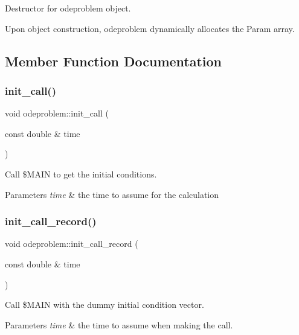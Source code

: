 Destructor for odeproblem object. 

Upon object construction, odeproblem dynamically allocates the Param array. 

\subsection{Member Function Documentation}
\mbox{\label{classodeproblem_a415e0001bfe1282764c339b6e8695ab8}} 
\subsubsection{\texorpdfstring{init\+\_\+call()}{init\_call()}}
{\footnotesize\ttfamily void odeproblem\+::init\+\_\+call (\begin{DoxyParamCaption}\item[{const double \&}]{time }\end{DoxyParamCaption})}

Call {\ttfamily \$\+M\+A\+IN} to get the initial conditions.


\begin{DoxyParams}{Parameters}
{\em time} & the time to assume for the calculation \\
\hline
\end{DoxyParams}
\mbox{\label{classodeproblem_adc4a5dbcc9561903a7aa81a90e8a908b}} 
\subsubsection{\texorpdfstring{init\+\_\+call\+\_\+record()}{init\_call\_record()}}
{\footnotesize\ttfamily void odeproblem\+::init\+\_\+call\+\_\+record (\begin{DoxyParamCaption}\item[{const double \&}]{time }\end{DoxyParamCaption})}

Call {\ttfamily \$\+M\+A\+IN} with the dummy initial condition vector.


\begin{DoxyParams}{Parameters}
{\em time} & the time to assume when making the call. \\
\hline
\end{DoxyParams}
\mbox{\label{classodeproblem_a258d7fdca6eb1b49cac25cea9fcca9c4}} 
